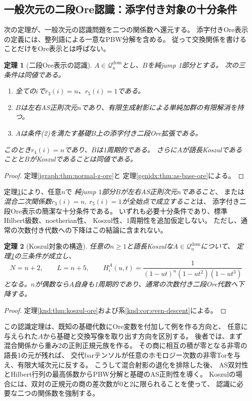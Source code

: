 \documentclass[11pt,a4paper]{ltjsarticle}
\newtheorem{theorem}{定理}[section]
\theoremstyle{definition}
\begin{document}
\subsection{一般次元の二段Ore認識：添字付き対象の十分条件}
次の定理が、一般次元の認識問題を二つの関係数へ還元する。
添字付きOre表示の定義には、整列語による一意なPBW分解を含める。
従って交換関係を書けることだけをOre表示とは呼ばない。

\begin{theorem}[二段Ore表示の認識]\label{intro:thm:recognition}
$A\in\mathcal Q_n^{\mathrm{dom}}$とし、$B$を純jump 1部分とする。
次の三条件は同値である。
\begin{enumerate}
\item 全ての$i$で$r_3(i)=n$、$r_5(i)=1$である。
\item $B$は左右AS正則次元$n$であり、有限生成射影による単純加群の有限解消を持つ。
\item $A$は条件(2)を満たす基礎$B$上の添字付き二段Ore拡張である。
\end{enumerate}
このとき$r_4(i)=n$であり、$B$は1周期的である。
さらに$A$が語長Koszulであることと$B$がKoszulであることは同値である。
\end{theorem}
\begin{proof}
定理\ref{igraph:thm:normal-z-ore}と
定理\ref{genidx:thm:as-base-ore}による。
\end{proof}

定理\ref{intro:thm:recognition}により、任意$n$で
\emph{純jump $1$部分$B$が左右AS正則次元$n$であること}、
または\emph{混合二次関係数$r_3(i)=n,\ r_5(i)=1$が全始点で成立すること}は、
添字付き二段Ore表示の簡潔な十分条件である。
いずれも必要十分条件であり、標準Hilbert級数、noetherian性、
Koszul性、1周期性を追加仮定しない。
ただし、通常の次数付き代数への下降はこの結論に含まれない。

\begin{theorem}[Koszul対象の構造]\label{intro:thm:koszul}
任意の$n\ge1$と語長Koszulな$A\in\mathcal Q_n^{\mathrm{dom}}$について、
定理\ref{intro:thm:recognition}の三条件が成立し、
\[
 N=n+2,\qquad L=n+5,\qquad
 H_i^A(u,t)=\frac{1}{(1-ut)^n(1-ut^2)(1-ut^3)}
\]
となる。$n$が偶数なら$A$自身も1周期的であり、通常の次数付き二段Ore代数へ下降する。
\end{theorem}
\begin{proof}
定理\ref{knd:thm:koszul-ore}および系\ref{knd:cor:even-descent}による。
\end{proof}

この認識定理は、既知の基礎代数にOre変数を付加して例を作る方向と、
任意に与えられた$A$から基礎と交換写像を取り出す方向を区別する。
後者では、まず混合関係から重み2の正則正規元族を作る。
その商に相互の積が零となる非零の語長1の元が残れば、
交代barテンソルが任意のホモロジー次数の非零Torを与え、有限大域次元に反する。
こうして混合射影の退化を排除した後、
AS双対性とHilbert行列の最高係数からPBW分解と基礎のAS正則性を導く。
Koszulの場合には、双対の正規元の商の差次数が0と2に限られることを使って、
認識に必要な二つの関係数を強制する。
\end{document}
